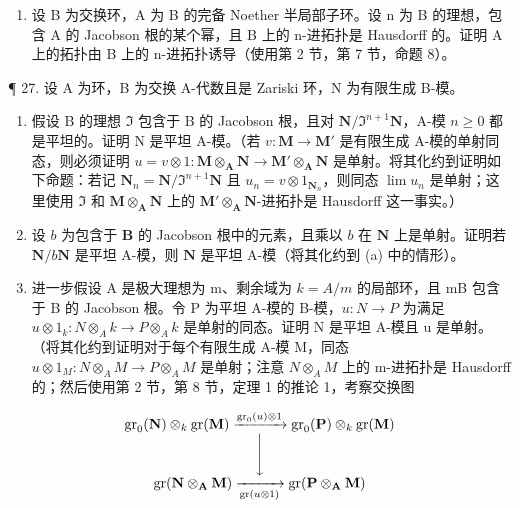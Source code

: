 \begin{enumerate}
\def\labelenumi{\arabic{enumi}.}
\setcounter{enumi}{25}
\tightlist
\item
  设 B 为交换环，A 为 B 的完备 Noether 半局部子环。设 n 为 B 的理想，包含 A 的 Jacobson 根的某个幂，且 B 上的 n-进拓扑是 Hausdorff 的。证明 A 上的拓扑由 B 上的 n-进拓扑诱导（使用第 2 节，第 7 节，命题 8）。
\end{enumerate}

¶ 27. 设 A 为环，B 为交换 A-代数且是 Zariski 环，N 为有限生成 B-模。

\begin{enumerate}
\def\labelenumi{(\alph{enumi})}
\item
  假设 B 的理想 \(\mathfrak{I}\) 包含于 B 的 Jacobson 根，且对 \(\mathbf{N} / \mathfrak{I}^{n + 1}\mathbf{N}\)，A-模 \(n\geqslant 0\) 都是平坦的。证明 N 是平坦 A-模。（若 \(v\colon \mathbf{M}\to \mathbf{M}'\) 是有限生成 A-模的单射同态，则必须证明 \(u = v\otimes 1:\mathbf{M}\otimes_{\mathbf{A}}\mathbf{N}\rightarrow \mathbf{M}'\otimes_{\mathbf{A}}\mathbf{N}\) 是单射。将其化约到证明如下命题：若记 \(\mathbf{N}_n = \mathbf{N} / \mathfrak{I}^{n + 1}\mathbf{N}\) 且 \(u_{n} = v\otimes 1_{\mathbf{N}_{n}}\)，则同态 \(\lim u_n\) 是单射；这里使用 \(\mathfrak{I}\) 和 \(\mathbf{M}\otimes_{\mathbf{A}}\mathbf{N}\) 上的 \(\mathbf{M}'\otimes_{\mathbf{A}}\mathbf{N}\)-进拓扑是 Hausdorff 这一事实。）
\item
   设 \(b\) 为包含于 \(\mathbf{B}\) 的 Jacobson 根中的元素，且乘以 \(b\) 在 \(\mathbf{N}\) 上是单射。证明若 \(\mathbf{N} / b\mathbf{N}\) 是平坦 A-模，则 \(\mathbf{N}\) 是平坦 A-模（将其化约到 (a) 中的情形）。
\item
  进一步假设 A 是极大理想为 m、剩余域为 \(k = A/m\) 的局部环，且 mB 包含于 B 的 Jacobson 根。令 P 为平坦 A-模的 B-模，\(u: N \to P\) 为满足 \(u \otimes 1_k: N \otimes_A k \to P \otimes_A k\) 是单射的同态。证明 N 是平坦 A-模且 u 是单射。（将其化约到证明对于每个有限生成 A-模 M，同态 \(u \otimes 1_M: N \otimes_A M \to P \otimes_A M\) 是单射；注意 \(N \otimes_A M\) 上的 m-进拓扑是 Hausdorff 的；然后使用第 2 节，第 8 节，定理 1 的推论 1，考察交换图
\end{enumerate}

\[
\begin{array}{c} \operatorname{gr} _ {0} (\mathbf {N}) \otimes_ {k} \operatorname{gr} (\mathbf {M}) \xrightarrow {\operatorname{gr} _ {0} (u) \otimes 1} \operatorname{gr} _ {0} (\mathbf {P}) \otimes_ {k} \operatorname{gr} (\mathbf {M}) \\ \Biggl \downarrow \\ \operatorname{gr} (\mathbf {N} \otimes_ {\mathbf {A}} \mathbf {M}) \xrightarrow [ \operatorname{gr} (u \otimes 1) ]{} \operatorname{gr} (\mathbf {P} \otimes_ {\mathbf {A}} \mathbf {M}) \end{array}
\]

